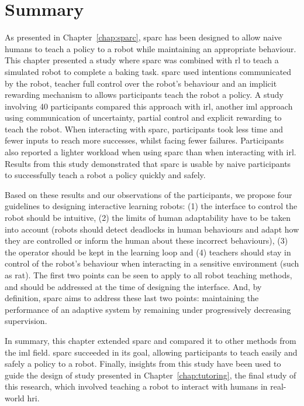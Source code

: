 \section{Summary}

As presented in Chapter~\ref{chap:sparc}, \gls{sparc} has been designed to allow naive humans to teach a policy to a robot while maintaining an appropriate behaviour. This chapter presented a study where \gls{sparc} was combined with \gls{rl} to teach a simulated robot to complete a baking task. \gls{sparc} used intentions communicated by the robot, teacher full control over the robot's behaviour and an implicit rewarding mechanism to allows participants teach the robot a policy. A study involving 40 participants compared this approach with \gls{irl}, another \gls{iml} approach using communication of uncertainty, partial control and explicit rewarding to teach the robot. When interacting with \gls{sparc}, participants took less time and fewer inputs to reach more successes, whilst facing fewer failures. Participants also reported a lighter workload when using \gls{sparc} than when interacting with \gls{irl}. Results from this study demonstrated that \gls{sparc} is usable by naive participants to successfully teach a robot a policy quickly and safely.

Based on these results and our observations of the participants, we propose four guidelines to designing interactive learning robots: (1) the interface to control the robot should be intuitive, (2) the limits of human adaptability have to be taken into account (robots should detect deadlocks in human behaviours and adapt how they are controlled or inform the human about these incorrect behaviours), (3) the operator should be kept in the learning loop and (4) teachers should stay in control of the robot's behaviour when interacting in a sensitive environment (such as \gls{rat}). The first two points can be seen to apply to all robot teaching methods, and should be addressed at the time of designing the interface. And, by definition, \gls{sparc} aims to address these last two points: maintaining the performance of an adaptive system by remaining under progressively decreasing supervision.

In summary, this chapter extended \gls{sparc} and compared it to other methods from the \gls{iml} field. \gls{sparc} succeeded in its goal, allowing participants to teach easily and safely a policy to a robot. Finally, insights from this study have been used to guide the design of study presented in Chapter~\ref{chap:tutoring}, the final study of this research, which involved teaching a robot to interact with humans in real-world \gls{hri}.


